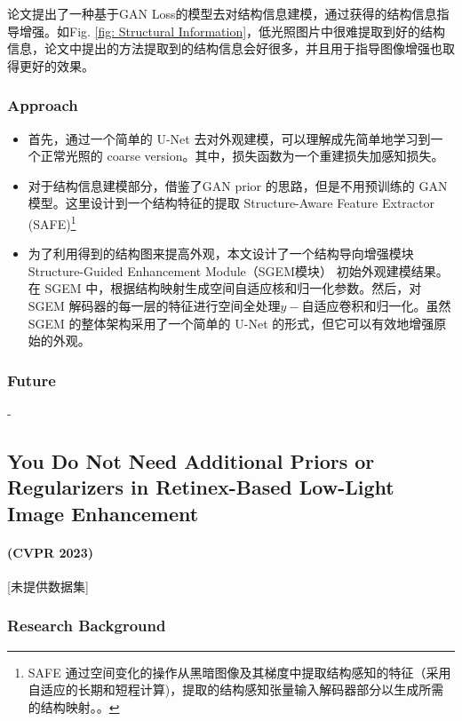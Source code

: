 \documentclass[letterpaper,10pt]{article}
\begin{document}
			论文提出了一种基于GAN Loss的模型去对结构信息建模，通过获得的结构信息指导增强。如Fig. \ref{fig: Structural Information}，低光照图片中很难提取到好的结构信息，论文中提出的方法提取到的结构信息会好很多，并且用于指导图像增强也取得更好的效果。
			
			\subsubsection{Approach}
			
			\begin{itemize}
				\item [(1)]
				首先，通过一个简单的 U-Net 去对外观建模，可以理解成先简单地学习到一个正常光照的 coarse version。其中，损失函数为一个重建损失加感知损失。
				\item [(2)]
				对于结构信息建模部分，借鉴了GAN prior \cite{4767851}的思路，但是不用预训练的 GAN 模型。这里设计到一个结构特征的提取 Structure-Aware Feature Extractor (SAFE)\footnote{SAFE 通过空间变化的操作从黑暗图像及其梯度中提取结构感知的特征（采用自适应的长期和短程计算)，提取的结构感知张量输入解码器部分以生成所需的结构映射。。} 
				\item [(3)]
				为了利用得到的结构图来提高外观，本文设计了一个结构导向增强模块 Structure-Guided Enhancement Module（SGEM模块） 初始外观建模结果。在 SGEM 中，根据结构映射生成空间自适应核和归一化参数。然后，对 SGEM 解码器的每一层的特征进行空间全处理$y-$自适应卷积和归一化。虽然 SGEM 的整体架构采用了一个简单的 U-Net 的形式，但它可以有效地增强原始的外观。
			\end{itemize}
			
			\subsubsection{Future}
			-
			
		\subsection{You Do Not Need Additional Priors or Regularizers in Retinex-Based Low-Light Image Enhancement}
		\paragraph{(CVPR 2023)} [未提供数据集]
			
			\subsubsection{Research Background}
			
\end{document}
